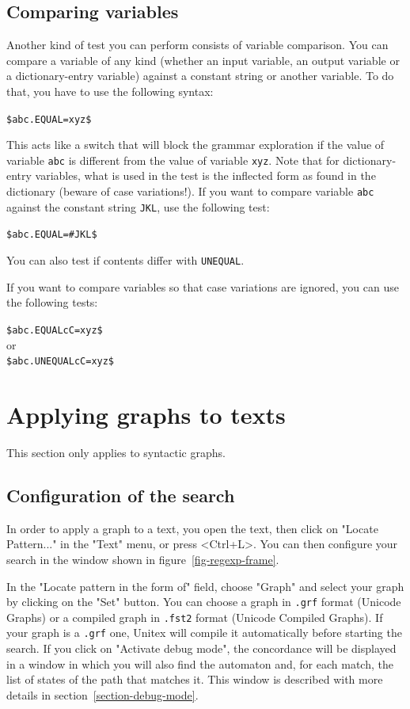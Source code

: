 \subsection{Comparing variables}
Another kind of test you can perform consists of variable comparison.
You can compare a variable of any kind (whether an input variable, an output variable or a dictionary-entry variable)
against a constant string or another variable. To do that, you have to use the following syntax:

\bigskip
\noindent \verb+$abc.EQUAL=xyz$+

\bigskip
\noindent This acts like a switch that will block the grammar exploration if the value of variable \verb+abc+
is different from the value of variable \verb+xyz+. Note that for dictionary-entry variables,
what is used in the test is the inflected form
as found in the dictionary (beware of case variations!). If you want to compare variable
\verb+abc+ against the constant string \verb+JKL+, use the following test:

\bigskip
\noindent \verb+$abc.EQUAL=#JKL$+

\bigskip
\noindent You can also test if contents differ with \verb+UNEQUAL+.

\bigskip
\noindent If you want to compare variables so that case variations are ignored, you can use the following tests:

\bigskip
\noindent \verb+$abc.EQUALcC=xyz$+ \\
or \\
\verb+$abc.UNEQUALcC=xyz$+

\section{Applying graphs to texts}
\label{section-applying-graphs-to-text}
This section only applies to syntactic graphs.
\subsection{Configuration of the search}
In order to apply a graph to a text, you open the text, then click on "Locate
Pattern..." in the "Text" menu, or press <Ctrl+L>. You can then configure your
search in the window shown in figure~\ref{fig-regexp-frame}.

\bigskip
{}
\noindent In the "Locate pattern in the form of" field, choose "Graph" and
select your graph by clicking on the "Set" button. You can choose a graph in \verb+.grf+
format (Unicode Graphs) or a compiled graph in \verb+.fst2+ format (Unicode
Compiled Graphs). If your graph is a \verb+.grf+ one, Unitex will compile it
automatically before starting the search. If you click on "Activate debug mode", the 
concordance will be displayed in a window in which you will also find the automaton and, 
for each match, the list of states of the path that matches it. This window is described
with more details in section~\ref{section-debug-mode}.

